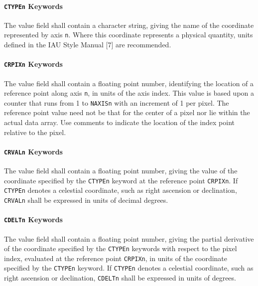    \paragraph{{\tt CTYPEn} Keywords}
 The value field shall contain a character 
 string, giving
 the name of the coordinate
 represented by axis {\tt n}. 
 Where this coordinate represents a physical quantity, 
 units defined in the 
 IAU Style Manual [7] are 
 recommended.
 
   \paragraph{{\tt CRPIXn} Keywords}
 The value field shall contain a floating point number,
 identifying the location of a reference point 
 along axis {\tt n},
 in units of the axis index. 
 This value is based upon a counter that runs
 from 1 to {\tt NAXISn} with an increment of 1 per pixel. 
 The reference point value need not be that for the center of a pixel 
 nor lie within the actual  data array.  Use comments to indicate 
 the location of the index point relative to the pixel.
  
   \paragraph{{\tt CRVALn} Keywords}
 The value field shall contain a floating point number,
 giving the value of the coordinate 
 specified by the {\tt CTYPEn}
 keyword at the reference 
 point {\tt CRPIXn}.  
 If {\tt CTYPEn} denotes a celestial 
 coordinate, 
 such as right ascension or declination, 
 {\tt CRVALn} shall be expressed in units of
 decimal degrees. 

   \paragraph{{\tt CDELTn} Keywords}
 The value field shall contain a floating point number,
 giving the partial derivative of the coordinate specified
 by the {\tt CTYPEn} keywords with respect to the pixel 
 index, evaluated at the reference 
 point {\tt CRPIXn}, in units of the 
 coordinate specified by  the {\tt CTYPEn} keyword.
 If {\tt CTYPEn} denotes a celestial 
 coordinate,
 such as right ascension or declination, 
 {\tt CDELTn} shall be expressed in units of degrees. 

